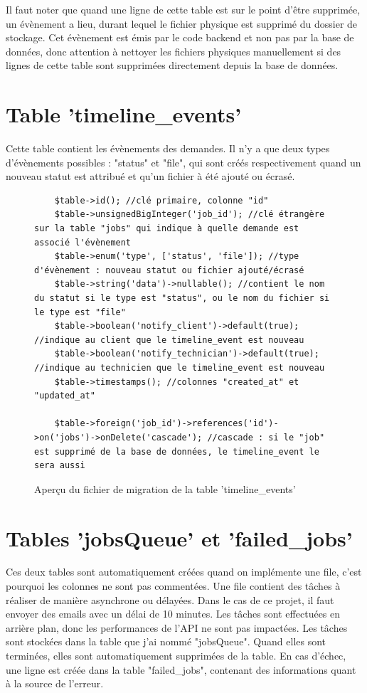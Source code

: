 \documentclass[
    iai, %
    eai, %
]{heig-tb}
\begin{document}
Il faut noter que quand une ligne de cette table est sur le point d'être supprimée, un évènement a lieu, durant lequel le fichier physique est supprimé du dossier de stockage.
Cet évènement est émis par le code backend et non pas par la base de données, donc attention à nettoyer les fichiers physiques manuellement si des lignes de cette table sont supprimées directement depuis la base de données.

\newpage
\section{Table 'timeline\_events'}
Cette table contient les évènements des demandes. Il n'y a que deux types d'évènements possibles : "status" et "file", qui sont créés respectivement quand un nouveau statut est attribué et qu'un fichier à été ajouté ou écrasé.

\begin{figure}[h]
  \begin{verbatim}
    $table->id(); //clé primaire, colonne "id"
    $table->unsignedBigInteger('job_id'); //clé étrangère sur la table "jobs" qui indique à quelle demande est associé l'évènement
    $table->enum('type', ['status', 'file']); //type d'évènement : nouveau statut ou fichier ajouté/écrasé
    $table->string('data')->nullable(); //contient le nom du statut si le type est "status", ou le nom du fichier si le type est "file"
    $table->boolean('notify_client')->default(true); //indique au client que le timeline_event est nouveau
    $table->boolean('notify_technician')->default(true); //indique au technicien que le timeline_event est nouveau
    $table->timestamps(); //colonnes "created_at" et "updated_at"

    $table->foreign('job_id')->references('id')->on('jobs')->onDelete('cascade'); //cascade : si le "job" est supprimé de la base de données, le timeline_event le sera aussi
  \end{verbatim}
  \caption{Aperçu du fichier de migration de la table 'timeline\_events'}
\end{figure}

\section{Tables 'jobsQueue' et 'failed\_jobs'}
Ces deux tables sont automatiquement créées quand on implémente une file, c'est pourquoi les colonnes ne sont pas commentées. Une file contient des tâches à réaliser de manière asynchrone ou délayées. Dans le cas de ce projet, il faut envoyer des emails avec un délai de 10 minutes. Les tâches sont effectuées en arrière plan, donc les performances de l'API ne sont pas impactées.
Les tâches sont stockées dans la table que j'ai nommé "jobsQueue". Quand elles sont terminées, elles sont automatiquement supprimées de la table. En cas d'échec, une ligne est créée dans la table "failed\_jobs", contenant des informations quant à la source de l'erreur.
\end{document}
